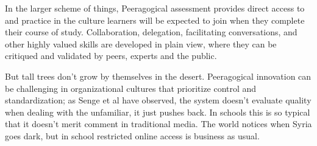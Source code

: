 
In the larger scheme of things, Peeragogical assessment provides direct
access to and practice in the culture learners will be expected to join
when they complete their course of study. Collaboration, delegation,
facilitating conversations, and other highly valued skills are developed
in plain view, where they can be critiqued and validated by peers,
experts and the public.




But tall trees don't grow by themselves in the desert. Peeragogical
innovation can be challenging in organizational cultures that prioritize
control and standardization; as Senge et al have observed, the system
doesn't evaluate quality when dealing with the unfamiliar, it just
pushes back. In schools this is so typical that it doesn't merit comment
in traditional media. The world notices when Syria goes dark, but in
school restricted online access is business as usual.


